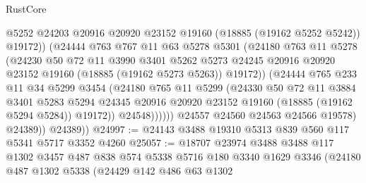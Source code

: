 \begin{lexlean}{RustCore}
\begin{coremodule}
                          @5252
                          @24203
                          @20916
                          @20920
                          @23152
                          @19160
                          (@18885 (@19162 @5252 @5242))
                          @19172))
                      (@24444
                        @763
                        @767
                        @11
                        @63
                        @5278
                        @5301
                        (@24180
                          @763
                          @11
                          @5278
                          (@24230
                            @50
                            @72
                            @11
                            @3990
                            @3401
                            @5262
                            @5273
                            @24245
                            @20916
                            @20920
                            @23152
                            @19160
                            (@18885 (@19162 @5273 @5263))
                            @19172))
                        (@24444
                          @765
                          @233
                          @11
                          @34
                          @5299
                          @3454
                          (@24180
                            @765
                            @11
                            @5299
                            (@24330
                              @50
                              @72
                              @11
                              @3884
                              @3401
                              @5283
                              @5294
                              @24345
                              @20916
                              @20920
                              @23152
                              @19160
                              (@18885 (@19162 @5294 @5284))
                              @19172))
                          @24548))))))
              @24557
              @24560
              @24563
              @24566
              @19578)
            @24389))
        @24389))
@24997 := @24143 @3488 @19310 @5313 @839 @560 @117 @5341 @5717 @3352 @4260
@25057 := @18707
    @23974
    @3488
    @3488
    @117
    @1302
    @3457
    @487
    @838
    @574
    @5338
    @5716
    @180
    @3340
    @1629
    @3346
    (@24180
      @487
      @1302
      @5338
      (@24429
        @142
        @486
        @63
        @1302

\end{coremodule}
\end{lexlean}
